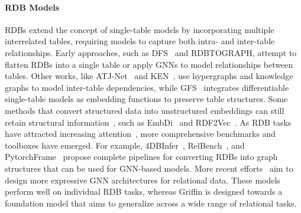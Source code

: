 \documentclass{article}
\theoremstyle{plain}
\theoremstyle{definition}
\theoremstyle{remark}
\begin{document}
\vspace*{-0.2cm}
\paragraph{RDB Models}
RDBs extend the concept of single-table models by incorporating multiple interrelated tables, requiring models to capture both intra- and inter-table relationships. Early approaches, such as DFS~\citep{kanter2015deep} and RDBTOGRAPH\cite{cvitkovic2020supervised}, attempt to flatten RDBs into a single table or apply GNNs to model relationships between tables. Other works, like ATJ-Net~\citep{bai2021atj} and KEN~\cite{cvetkov2023relational}, use hypergraphs and knowledge graphs to model inter-table dependencies, while GFS~\citep{zhang2023gfs} integrates differentiable single-table models as embedding functions to preserve table structures. 
Some methods that convert structured data into unstructured embeddings can still retain structural information~\citep{grover2016node2vec}, such as EmbDi~\citep{cappuzzo2020creating} and RDF2Vec~\citep{ristoski2016rdf2vec}. As RDB tasks have attracted increasing attention~\citep{fey2024position}, more comprehensive benchmarks and toolboxes have emerged. For example, 4DBInfer~\citep{wang20244dbinfer}, RelBench~\citep{robinson2024relbench,fey2023relational}, and PytorchFrame~\cite{hu2024pytorch} propose complete pipelines for converting RDBs into graph structures that can be used for GNN-based models. More recent efforts~\citep{yuan2024contextgnn,chen2025relgnn} aim to design more expressive GNN architectures for relational data. These models perform well on individual RDB tasks, whereas Griffin is designed towards a foundation model that aims to generalize across a wide range of relational tasks.

\end{document}
